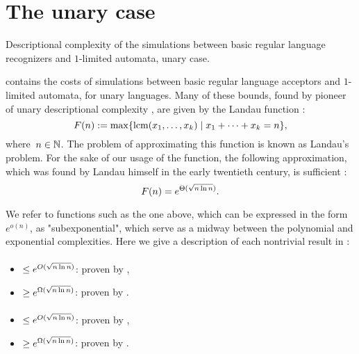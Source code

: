 \section{The unary case}\label{sec:sims-unary}

\begin{table}
	\centering
	\caption{Descriptional complexity of the simulations between basic regular language recognizers and $1$-limited automata, unary case.}
	\label{tab:sims-1la-unary}
\end{table}

 contains the costs of simulations between basic regular language acceptors and $1$-limited automata, for unary languages.
Many of these bounds, found by pioneer of unary descriptional complexity , are given by the Landau function \cite{Chr86}:
\begin{equation}
	F(n) := \max\{\operatorname{lcm}(x_1,\dots,x_k)\mid x_1+\dots+x_k=n\} \text,
\end{equation}
where~$n\in\mathbb N$.
The problem of approximating this function is known as Landau's problem.
For the sake of our usage of the function, the following approximation, which was found by Landau himself in the early twentieth century, is sufficient \cite{Lan03,Lan09}:
\begin{equation}
	F(n) = e^{\Theta(\sqrt{n\ln n})} \text.
\end{equation}

We refer to functions such as the one above, which can be expressed in the form~$e^{o(n)}$, as "subexponential", which serve as a midway between the polynomial and exponential complexities.
Here we give a description of each nontrivial result in :

\paragraph{\ONFA{}\tto\ODFA}
\begin{itemize}
	\item $\le e^{O(\sqrt{n\ln n})}$: proven by ,
	\item $\ge e^{\Omega(\sqrt{n\ln n})}$: proven by .
\end{itemize}
\paragraph{\TDFA{}\tto\ODFA}\label{cost:2DFAto1DFAu}
\begin{itemize}
	\item $\le e^{O(\sqrt{n\ln n})}$: proven by ,
	\item $\ge e^{\Omega(\sqrt{n\ln n})}$: proven by .
\end{itemize}
